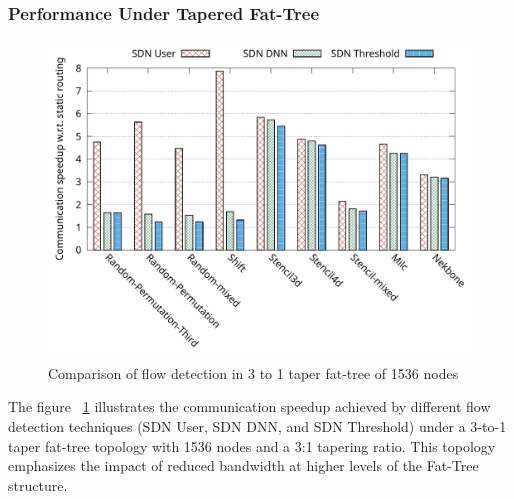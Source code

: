 \subsubsection{Performance Under Tapered Fat-Tree}
\begin{figure}[h]
  \centering
  \includegraphics[width=\columnwidth]{./figs_4/taper_fat_flow_detection.pdf}
  \caption{Comparison of flow detection in 3 to 1 taper fat-tree of 1536 nodes}
  \label{fig:fld_taper}
\end{figure}

The figure ~\ref{fig:fld_taper} illustrates the communication speedup achieved by different flow detection techniques (SDN User, SDN DNN, and SDN Threshold) under a 3-to-1 taper fat-tree topology with 1536 nodes and a 3:1 tapering ratio. This topology emphasizes the impact of reduced bandwidth at higher levels of the Fat-Tree structure.


